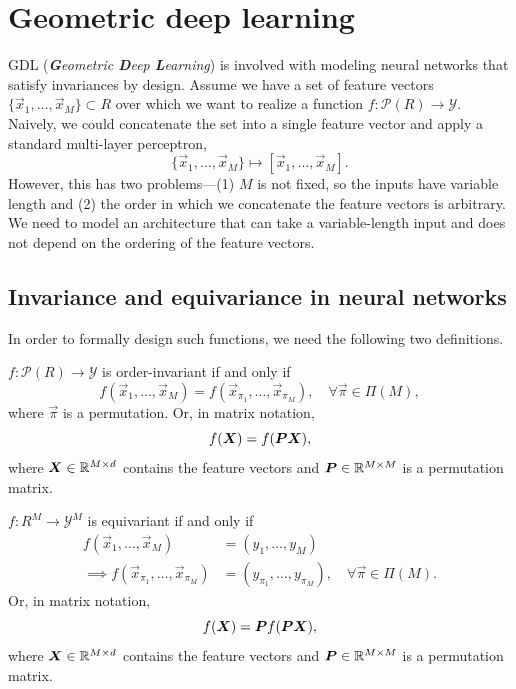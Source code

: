 \section{Geometric deep learning}

GDL (\textit{\textbf{G}eometric \textbf{D}eep \textbf{L}earning}) is involved with modeling neural
networks that satisfy invariances by design. Assume we have a set of feature vectors $\{ \vec{x}_1,
    \ldots, \vec{x}_M \} \subset R$ over which we want to realize a function $f: \mathcal{P}(R) \to
    \mathcal{Y}$. Naively, we could concatenate the set into a single feature vector and apply a
standard multi-layer perceptron, \[
    \{ \vec{x}_1, \ldots, \vec{x}_M \} \mapsto [\vec{x}_1, \ldots, \vec{x}_M].
\]
However, this has two problems---(1) $M$ is not fixed, so the inputs have variable length and (2)
the order in which we concatenate the feature vectors is arbitrary. We need to model an
architecture that can take a variable-length input and does not depend on the ordering of the
feature vectors.

\subsection{Invariance and equivariance in neural networks}

In order to formally design such functions, we need the following two definitions.

\begin{definition}
    $f: \mathcal{P}(R) \to \mathcal{Y}$ is order-invariant if and only if \[
        f(\vec{x}_1, \ldots, \vec{x}_M) = f(\vec{x}_{\pi_1}, \ldots, \vec{x}_{\pi_M}), \quad \forall \vec{\pi} \in \Pi(M),
    \]
    where $\vec{\pi}$ is a permutation. Or, in matrix notation, \[
        f(\bm{X}) = f(\bm{P} \bm{X}),
    \]
    where $\bm{X} \in \mathbb{R}^{M\times d}$ contains the feature vectors and $\bm{P} \in \mathbb{R}^{M \times M}$
    is a permutation matrix.
\end{definition}

\begin{definition}[Equivariance]
    $f: R^M \to \mathcal{Y}^M$ is equivariant if and only if
    \begin{align*}
        f(\vec{x}_1, \ldots, \vec{x}_M)                      & = (y_1, \ldots, y_M)                                                  \\
        \implies f(\vec{x}_{\pi_1}, \ldots, \vec{x}_{\pi_M}) & = (y_{\pi_1}, \ldots, y_{\pi_M}), \quad \forall \vec{\pi} \in \Pi(M).
    \end{align*}
    Or, in matrix notation, \[
        f(\bm{X}) = \bm{P} f(\bm{P}\bm{X}),
    \]
    where $\bm{X} \in \mathbb{R}^{M\times d}$ contains the feature vectors and $\bm{P} \in \mathbb{R}^{M\times M}$ is
    a permutation matrix.
\end{definition}

